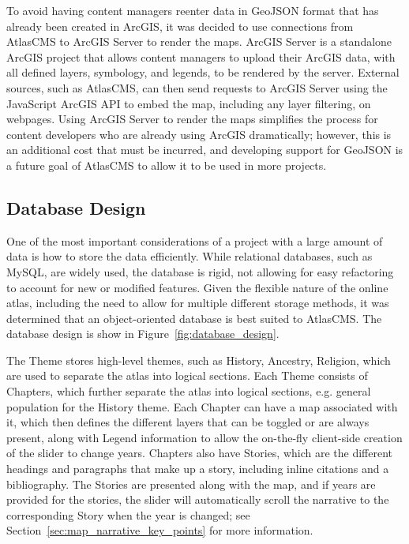 \documentclass[11pt, final, conference, twocolumn]{IEEEtran}
\begin{document}
To avoid having content managers reenter data in GeoJSON format that has already been created in ArcGIS, it was decided to use connections from AtlasCMS to ArcGIS Server to render the maps. ArcGIS Server is a standalone ArcGIS project that allows content managers to upload their ArcGIS data, with all defined layers, symbology, and legends, to be rendered by the server. External sources, such as AtlasCMS, can then send requests to ArcGIS Server using the JavaScript ArcGIS API to embed the map, including any layer filtering, on webpages. Using ArcGIS Server to render the maps simplifies the process for content developers who are already using ArcGIS dramatically; however, this is an additional cost that must be incurred, and developing support for GeoJSON is a future goal of AtlasCMS to allow it to be used in more projects.

\subsection{Database Design}
\label{sec:database_design}
One of the most important considerations of a project with a large amount of data is how to store the data efficiently. While relational databases, such as MySQL, are widely used, the database is rigid, not allowing for easy refactoring to account for new or modified features. Given the flexible nature of the online atlas, including the need to allow for multiple different storage methods, it was determined that an object-oriented database is best suited to AtlasCMS. The database design is show in Figure~\ref{fig:database_design}.

The Theme stores high-level themes, such as History, Ancestry, Religion, which are used to separate the atlas into logical sections. Each Theme consists of Chapters, which further separate the atlas into logical sections, e.g. general population for the History theme. Each Chapter can have a map associated with it, which then defines the different layers that can be toggled or are always present, along with Legend information to allow the on-the-fly client-side creation of the slider to change years. Chapters also have Stories, which are the different headings and paragraphs that make up a story, including inline citations and a bibliography. The Stories are presented along with the map, and if years are provided for the stories, the slider will automatically scroll the narrative to the corresponding Story when the year is changed; see Section~\ref{sec:map_narrative_key_points} for more information.
\end{document}
